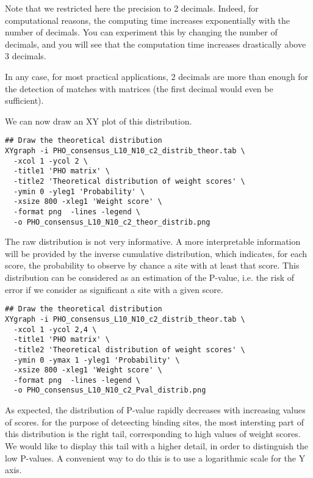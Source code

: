Note that we restricted here the precision to 2 decimals. Indeed, for
computational reasons, the computing time increases exponentially with
the number of decimals. You can experiment this by changing the number
of decimals, and you will see that the computation time increases
drastically above 3 decimals.  

In any case, for most practical applications, 2 decimals are more than
enough for the detection of matches with matrices (the first decimal
would even be sufficient).

We can now draw an XY plot of this distribution. 

{\color{Blue} \begin{footnotesize} 
\begin{verbatim}
## Draw the theoretical distribution
XYgraph -i PHO_consensus_L10_N10_c2_distrib_theor.tab \
  -xcol 1 -ycol 2 \
  -title1 'PHO matrix' \
  -title2 'Theoretical distribution of weight scores' \
  -ymin 0 -yleg1 'Probability' \
  -xsize 800 -xleg1 'Weight score' \
  -format png  -lines -legend \
  -o PHO_consensus_L10_N10_c2_theor_distrib.png
\end{verbatim} \end{footnotesize}
}


The raw distribution is not very informative. A more interpretable
information will be provided by the inverse cumulative distribution,
which indicates, for each score, the probability to observe by chance
a site with at least that score. This distribution can be considered
as an estimation of the P-value, i.e. the risk of error if we consider
as significant a site with a given score.

{\color{Blue} \begin{footnotesize} 
\begin{verbatim}
## Draw the theoretical distribution
XYgraph -i PHO_consensus_L10_N10_c2_distrib_theor.tab \
  -xcol 1 -ycol 2,4 \
  -title1 'PHO matrix' \
  -title2 'Theoretical distribution of weight scores' \
  -ymin 0 -ymax 1 -yleg1 'Probability' \
  -xsize 800 -xleg1 'Weight score' \
  -format png  -lines -legend \
  -o PHO_consensus_L10_N10_c2_Pval_distrib.png
\end{verbatim} \end{footnotesize}
}

As expected, the distribution of P-value rapidly decreases with
increasing values of scores. for the purpose of deteecting binding
sites, the most intersting part of this distribution is the right
tail, corresponding to high values of weight scores. We would like to
display this tail with a higher detail, in order to distinguish the
low P-values. A convenient way to do this is to use a logarithmic
scale for the Y axis.

